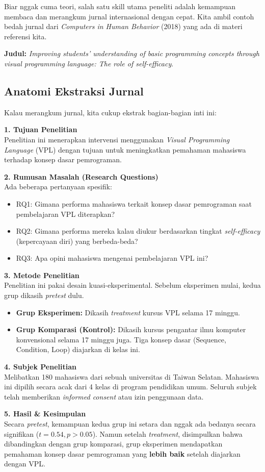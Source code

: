\documentclass[12pt,a4paper]{article}
\begin{document}
Biar nggak cuma teori, salah satu skill utama peneliti adalah kemampuan membaca dan merangkum jurnal internasional dengan cepat. Kita ambil contoh bedah jurnal dari \textit{Computers in Human Behavior} (2018) yang ada di materi referensi kita.

\textbf{Judul:} \textit{Improving students' understanding of basic programming concepts through visual programming language: The role of self-efficacy}.

\subsection{Anatomi Ekstraksi Jurnal}
Kalau merangkum jurnal, kita cukup ekstrak bagian-bagian inti ini:

\textbf{1. Tujuan Penelitian} \\
Penelitian ini menerapkan intervensi menggunakan \textit{Visual Programming Language} (VPL) dengan tujuan untuk meningkatkan pemahaman mahasiswa terhadap konsep dasar pemrograman.

\textbf{2. Rumusan Masalah (Research Questions)} \\
Ada beberapa pertanyaan spesifik:
\begin{itemize}
    \item RQ1: Gimana performa mahasiswa terkait konsep dasar pemrograman saat pembelajaran VPL diterapkan?
    \item RQ2: Gimana performa mereka kalau diukur berdasarkan tingkat \textit{self-efficacy} (kepercayaan diri) yang berbeda-beda?
    \item RQ3: Apa opini mahasiswa mengenai pembelajaran VPL ini?
\end{itemize}

\textbf{3. Metode Penelitian} \\
Penelitian ini pakai desain kuasi-eksperimental. Sebelum eksperimen mulai, kedua grup dikasih \textit{pretest} dulu.
\begin{itemize}
    \item \textbf{Grup Eksperimen:} Dikasih \textit{treatment} kursus VPL selama 17 minggu.
    \item \textbf{Grup Komparasi (Kontrol):} Dikasih kursus pengantar ilmu komputer konvensional selama 17 minggu juga. Tiga konsep dasar (Sequence, Condition, Loop) diajarkan di kelas ini.
\end{itemize}

\textbf{4. Subjek Penelitian} \\
Melibatkan 180 mahasiswa dari sebuah universitas di Taiwan Selatan. Mahasiswa ini dipilih secara acak dari 4 kelas di program pendidikan umum. Seluruh subjek telah memberikan \textit{informed consent} atau izin penggunaan data.

\textbf{5. Hasil \& Kesimpulan} \\
Secara \textit{pretest}, kemampuan kedua grup ini setara dan nggak ada bedanya secara signifikan ($t=0.54, p > 0.05$). Namun setelah \textit{treatment}, disimpulkan bahwa dibandingkan dengan grup komparasi, grup eksperimen mendapatkan pemahaman konsep dasar pemrograman yang \textbf{lebih baik} setelah diajarkan dengan VPL.
\end{document}
